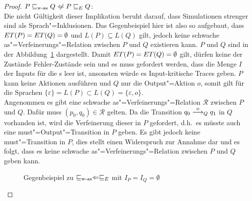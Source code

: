 \begin{proof}
  $P\wasRel Q\hspace{0.1cm}\not\hspace{-0.1cm}\Leftarrow P\ERel Q$:\\
  Die nicht Gültigkeit dieser Implikation beruht darauf, dass Simulationen
  strenger sind als Sprach"=Inklusionen. Das Gegenbeispiel hier ist also so
  aufgebaut, dass $ET (P) =ET (Q) = \emptyset$ und $L(P) \subseteq L(Q)$
  gilt, jedoch keine schwache as"=Verfeinerungs"=Relation zwischen $P$ und $Q$
  existieren kann. $P$ und $Q$ sind in der Abbildung~\ref{WasEGegenBsp}
  dargestellt. Damit $ET (P) =ET (Q) = \emptyset$ gilt, dürfen keine der
  Zustände Fehler-Zustände sein und es muss gefordert werden, dass die Menge
  $I$ der Inputs für die \MEIO{}s leer ist, ansonsten würde es Input-kritische
  Traces geben. $P$ kann keine Aktionen ausführen und $Q$ nur die
  Output"=Aktion $o$, somit gilt für die Sprachen $\{\varepsilon\} = L(P)
  \subset L(Q) = \{\varepsilon , o\}$.\\
  Angenommen es gibt eine schwache as"=Verfeinerungs"=Relation $\mathcal{R}$
  zwischen $P$ und $Q$. Dafür muss $(p_0,q_0)\in \mathcal{R}$ gelten. Da die
  Transition $q_0 \must[o]_Q q_1$ in $Q$ vorhanden ist, wird die Verfeinerung
  dieser in $P$ gefordert, d.h.\ es müsste auch eine must"=Output"=Transition
  in $P$ geben. Es gibt jedoch keine must"=Transition in $P$, dies stellt einen
  Widerspruch zur Annahme dar und es folgt, dass es keine schwache
  as"=Verfeinerungs"=Relation zwischen $P$ und $Q$ geben kann.

  \begin{figure}[htbp]
    \begin{center}
      \caption{Gegenbeispiel zu $\sqsubseteq _{\mathrm{w}\text{-}\mathrm{as}} \Leftarrow  \sqsubseteq  _E$ mit $I_P = I_Q =
      \emptyset$}
      \label{WasEGegenBsp}
    \end{center}
  \end{figure}
\end{proof}

